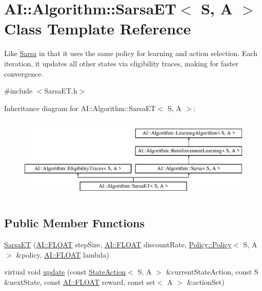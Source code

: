 \hypertarget{classAI_1_1Algorithm_1_1SarsaET}{\section{A\+I\+:\+:Algorithm\+:\+:Sarsa\+E\+T$<$ S, A $>$ Class Template Reference}
\label{classAI_1_1Algorithm_1_1SarsaET}
}


Like \hyperlink{classAI_1_1Algorithm_1_1Sarsa}{Sarsa} in that it uses the same policy for learning and action selection. Each iteration, it updates all other states via eligibility traces, making for faster convergence.  




{\ttfamily \#include $<$Sarsa\+E\+T.\+h$>$}

Inheritance diagram for A\+I\+:\+:Algorithm\+:\+:Sarsa\+E\+T$<$ S, A $>$\+:\begin{figure}[H]
\begin{center}
\leavevmode
\includegraphics[height=4.000000cm]{classAI_1_1Algorithm_1_1SarsaET}
\end{center}
\end{figure}
\subsection*{Public Member Functions}
\begin{DoxyCompactItemize}
\item 
\hyperlink{classAI_1_1Algorithm_1_1SarsaET_aa934143376cc47c6e42e3ec67fb93eae}{Sarsa\+E\+T} (\hyperlink{namespaceAI_a41b74884a20833db653dded3918e05c3}{A\+I\+::\+F\+L\+O\+A\+T} step\+Size, \hyperlink{namespaceAI_a41b74884a20833db653dded3918e05c3}{A\+I\+::\+F\+L\+O\+A\+T} discount\+Rate, \hyperlink{classAI_1_1Algorithm_1_1Policy_1_1Policy}{Policy\+::\+Policy}$<$ S, A $>$ \&policy, \hyperlink{namespaceAI_a41b74884a20833db653dded3918e05c3}{A\+I\+::\+F\+L\+O\+A\+T} lambda)
\item 
virtual void \hyperlink{classAI_1_1Algorithm_1_1SarsaET_adf13376b7ec8fdfa2b19ffadb1aa81e7}{update} (const \hyperlink{classAI_1_1StateAction}{State\+Action}$<$ S, A $>$ \&current\+State\+Action, const S \&next\+State, const \hyperlink{namespaceAI_a41b74884a20833db653dded3918e05c3}{A\+I\+::\+F\+L\+O\+A\+T} reward, const set$<$ A $>$ \&action\+Set)
\end{DoxyCompactItemize}
